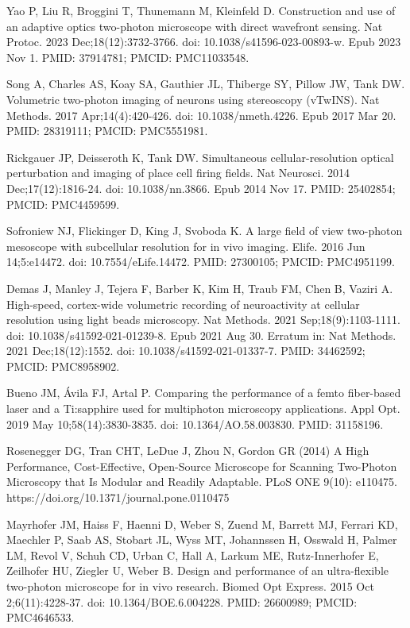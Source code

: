 \documentclass[10pt,letterpaper]{article}
\begin{document}
\begin{thebibliography}{10}
Yao P, Liu R, Broggini T, Thunemann M, Kleinfeld D. Construction and use of an adaptive optics two-photon microscope with direct wavefront sensing. Nat Protoc. 2023 Dec;18(12):3732-3766. doi: 10.1038/s41596-023-00893-w. Epub 2023 Nov 1. PMID: 37914781; PMCID: PMC11033548.

Song A, Charles AS, Koay SA, Gauthier JL, Thiberge SY, Pillow JW, Tank DW. Volumetric two-photon imaging of neurons using stereoscopy (vTwINS). Nat Methods. 2017 Apr;14(4):420-426. doi: 10.1038/nmeth.4226. Epub 2017 Mar 20. PMID: 28319111; PMCID: PMC5551981.

Rickgauer JP, Deisseroth K, Tank DW. Simultaneous cellular-resolution optical perturbation and imaging of place cell firing fields. Nat Neurosci. 2014 Dec;17(12):1816-24. doi: 10.1038/nn.3866. Epub 2014 Nov 17. PMID: 25402854; PMCID: PMC4459599.

Sofroniew NJ, Flickinger D, King J, Svoboda K. A large field of view two-photon mesoscope with subcellular resolution for in vivo imaging. Elife. 2016 Jun 14;5:e14472. doi: 10.7554/eLife.14472. PMID: 27300105; PMCID: PMC4951199.

Demas J, Manley J, Tejera F, Barber K, Kim H, Traub FM, Chen B, Vaziri A. High-speed, cortex-wide volumetric recording of neuroactivity at cellular resolution using light beads microscopy. Nat Methods. 2021 Sep;18(9):1103-1111. doi: 10.1038/s41592-021-01239-8. Epub 2021 Aug 30. Erratum in: Nat Methods. 2021 Dec;18(12):1552. doi: 10.1038/s41592-021-01337-7. PMID: 34462592; PMCID: PMC8958902.

Bueno JM, Ávila FJ, Artal P. Comparing the performance of a femto fiber-based laser and a Ti:sapphire used for multiphoton microscopy applications. Appl Opt. 2019 May 10;58(14):3830-3835. doi: 10.1364/AO.58.003830. PMID: 31158196.

Rosenegger DG, Tran CHT, LeDue J, Zhou N, Gordon GR (2014) A High Performance, Cost-Effective, Open-Source Microscope for Scanning Two-Photon Microscopy that Is Modular and Readily Adaptable. PLoS ONE 9(10): e110475. https://doi.org/10.1371/journal.pone.0110475

Mayrhofer JM, Haiss F, Haenni D, Weber S, Zuend M, Barrett MJ, Ferrari KD, Maechler P, Saab AS, Stobart JL, Wyss MT, Johannssen H, Osswald H, Palmer LM, Revol V, Schuh CD, Urban C, Hall A, Larkum ME, Rutz-Innerhofer E, Zeilhofer HU, Ziegler U, Weber B. Design and performance of an ultra-flexible two-photon microscope for in vivo research. Biomed Opt Express. 2015 Oct 2;6(11):4228-37. doi: 10.1364/BOE.6.004228. PMID: 26600989; PMCID: PMC4646533.


\end{thebibliography}
\end{document}
